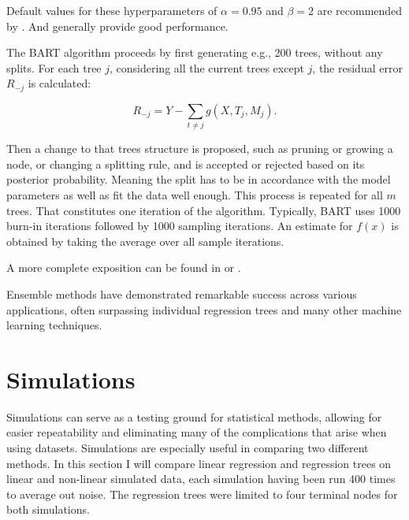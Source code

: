 \documentclass[12pt]{article}
\begin{document}
Default values for these hyperparameters of $\alpha = 0.95$ and $\beta = 2$ are recommended by \citep{chipman2010}. And generally provide good performance.

The BART algorithm proceeds by first generating e.g., 200 trees, without any splits. For each tree $j$, considering all the current trees except $j$, the residual error $R_{-j}$ is calculated:

\begin{equation}
    R_{-j} = Y - \sum_{t\not=j} g(X,T_j,M_j).
\end{equation}

Then a change to that trees structure is proposed, such as pruning or growing a node, or changing a splitting rule, and is accepted or rejected based on its posterior probability. Meaning the split has to be in accordance with the model parameters as well as fit the data well enough. This process is repeated for all $m$ trees. That constitutes one iteration of the algorithm. Typically, BART uses 1000 burn-in iterations followed by 1000 sampling iterations. An estimate for $f(x)$ is obtained by taking the average over all sample iterations.

A more complete exposition can be found in \citep{tan2019} or \citep{chipman2010}.

Ensemble methods have demonstrated remarkable success across various applications, often surpassing individual regression trees and many other machine learning techniques.


\section{Simulations}

Simulations can serve as a testing ground for statistical methods, allowing for easier repeatability and eliminating many of the complications that arise when using datasets. Simulations are especially useful in comparing two different methods. In this section I will compare linear regression and regression trees on linear and non-linear simulated data, each simulation having been run 400 times to average out noise. The regression trees were limited to four terminal nodes for both simulations.
\end{document}
